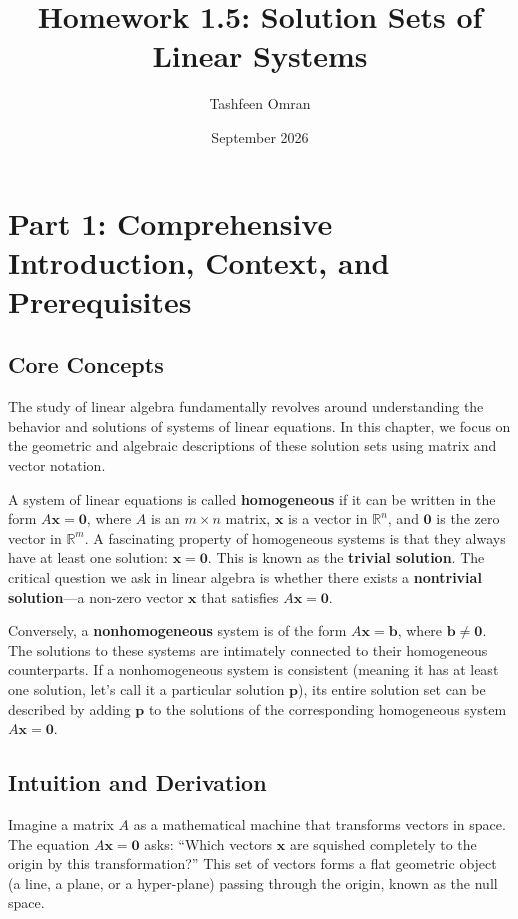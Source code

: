 \documentclass[11pt]{article}
\title{Homework 1.5: Solution Sets of Linear Systems}
\author{Tashfeen Omran}
\date{September 2026}
\begin{document}
\maketitle
\tableofcontents
\newpage

\section{Part 1: Comprehensive Introduction, Context, and Prerequisites}

\subsection{Core Concepts}
The study of linear algebra fundamentally revolves around understanding the behavior and solutions of systems of linear equations. In this chapter, we focus on the geometric and algebraic descriptions of these solution sets using matrix and vector notation. 

A system of linear equations is called \textbf{homogeneous} if it can be written in the form $A\mathbf{x} = \mathbf{0}$, where $A$ is an $m \times n$ matrix, $\mathbf{x}$ is a vector in $\mathbb{R}^n$, and $\mathbf{0}$ is the zero vector in $\mathbb{R}^m$. A fascinating property of homogeneous systems is that they always have at least one solution: $\mathbf{x} = \mathbf{0}$. This is known as the \textbf{trivial solution}. The critical question we ask in linear algebra is whether there exists a \textbf{nontrivial solution}—a non-zero vector $\mathbf{x}$ that satisfies $A\mathbf{x} = \mathbf{0}$. 

Conversely, a \textbf{nonhomogeneous} system is of the form $A\mathbf{x} = \mathbf{b}$, where $\mathbf{b} \neq \mathbf{0}$. The solutions to these systems are intimately connected to their homogeneous counterparts. If a nonhomogeneous system is consistent (meaning it has at least one solution, let's call it a particular solution $\mathbf{p}$), its entire solution set can be described by adding $\mathbf{p}$ to the solutions of the corresponding homogeneous system $A\mathbf{x} = \mathbf{0}$.

\subsection{Intuition and Derivation}
Imagine a matrix $A$ as a mathematical machine that transforms vectors in space. The equation $A\mathbf{x} = \mathbf{0}$ asks: ``Which vectors $\mathbf{x}$ are squished completely to the origin by this transformation?'' This set of vectors forms a flat geometric object (a line, a plane, or a hyper-plane) passing through the origin, known as the null space.
\end{document}
